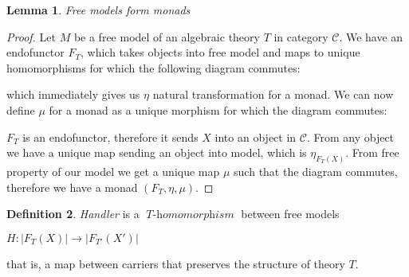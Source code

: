 \documentclass[declaration,shortabstract]{iithesis}
\theoremstyle{definition} \newtheorem{definition}{Definition}[chapter]
\theoremstyle{remark} \newtheorem{remark}[definition]{Observation}
\theoremstyle{plain} \newtheorem{theorem}[definition]{Theorem}
\theoremstyle{plain} \newtheorem{lemma}[definition]{Lemma}
\newcommand{\mathVar}[1]{{\operatorname{\mathit{#1}}}}
\begin{document}
    \begin{lemma}{Free models form monads}
    \end{lemma}
    \begin{proof}
        Let $M$ be a free model of an algebraic theory $T$ in category $\mathcal{C}$. We
        have an endofunctor $ F_{T}$, which takes objects into free model and
        maps to unique homomorphisms for which the following diagram commutes:

        \begin{center}
        \end{center}

        \noindent
        which immediately gives us $\eta$ natural transformation for a monad.
        We can now define $\mu{}$ for a monad as a unique morphism for which
        the diagram commutes:

        \begin{center}
        \end{center}

        \noindent
        $F_{T}$ is an endofunctor, therefore it sends $X$ into an object in $\mathcal{C}$.
        From any object we have a unique map sending an object into model,
        which is $\eta_{F_{T} (X)}$. From free property of our model we get
        a unique map $\mu{}$ such that the diagram commutes, therefore we have
        a monad $(F_{T}, \eta{}, \mu{})$.

    \end{proof}


    \begin{definition} \textit{Handler} is a $\mathVar{T-homomorphism}$ between
    free models

        \begin{center}
        $ H : {| F_{T} (X) |} \rightarrow {| F_{T'} (X') |} $
        \end{center}

    \noindent
    that is, a map between carriers that preserves the structure of theory $T$.

    \end{definition}
\end{document}
